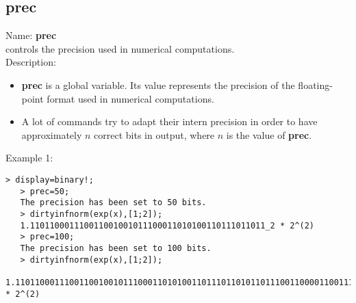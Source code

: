 \subsection{ prec }
\noindent Name: \textbf{prec}\\
controls the precision used in numerical computations.\\

\noindent Description: \begin{itemize}

\item \textbf{prec} is a global variable. Its value represents the precision of the 
   floating-point format used in numerical computations.

\item A lot of commands try to adapt their intern precision in order to have 
   approximately $n$ correct bits in output, where $n$ is the value of \textbf{prec}.
\end{itemize}
\noindent Example 1: 
\begin{center}\begin{minipage}{14.8cm}\begin{Verbatim}[frame=single]
   > display=binary!;
   > prec=50;
   The precision has been set to 50 bits.
   > dirtyinfnorm(exp(x),[1;2]);
   1.110110001110011001001011100011010100110111011011_2 * 2^(2)
   > prec=100;
   The precision has been set to 100 bits.
   > dirtyinfnorm(exp(x),[1;2]);
   1.11011000111001100100101110001101010011011101101011011100110000110011101000111011101000100000011011_2 * 2^(2)
\end{Verbatim}
\end{minipage}\end{center}

